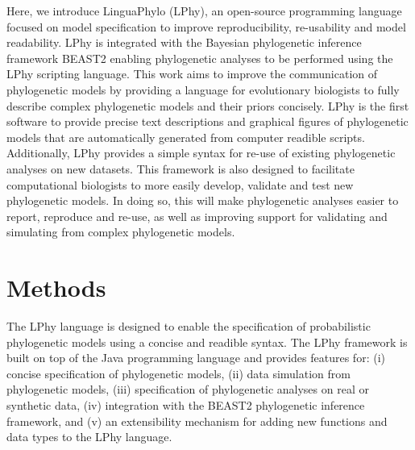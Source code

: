 \documentclass[10pt,letterpaper,table]{article}
\begin{document}
Here, we introduce LinguaPhylo (LPhy), an open-source programming
language focused on model specification to improve reproducibility, re-usability and model readability. 
LPhy is integrated with the Bayesian phylogenetic inference framework BEAST2 enabling phylogenetic analyses to be performed using the LPhy scripting language. 
This work aims to improve the communication of phylogenetic models by providing a language for evolutionary biologists to fully describe complex phylogenetic models and their priors concisely. 
LPhy is the first software to provide precise text descriptions and graphical figures of phylogenetic models that are automatically generated from computer readible scripts.  
Additionally, LPhy provides a simple syntax for re-use of existing phylogenetic analyses on new datasets. 
This framework is also designed to facilitate computational biologists to more easily develop, validate and test new phylogenetic models. 
In doing so, this will make phylogenetic analyses easier to report, reproduce and re-use, as well as improving support for validating and simulating from complex phylogenetic models. 


\section{Methods}
The LPhy language is designed to enable the specification of probabilistic phylogenetic models using a concise and readible syntax.  
The LPhy framework is built on top of the Java programming language and provides features for: 
(i) concise specification of phylogenetic models, (ii) data simulation from phylogenetic models, (iii) specification of phylogenetic analyses on real or synthetic data, (iv) integration with the BEAST2 phylogenetic inference framework, and (v) an extensibility mechanism for adding new functions and data types to the LPhy language.
 
\end{document}
